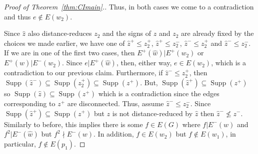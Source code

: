 \documentclass[a4paper, 12pt]{article}
\theoremstyle{plain}
\theoremstyle{definition}
\theoremstyle{remark}
\begin{document}
\begin{proof}[Proof of Theorem~\ref{thm:CImain}.]
Thus, in both cases we come to a contradiction and thus $e \not\in E(w_2)$.
\vspace{2mm}



Since $\hat z$ also distance-reduces $z_2$ and the signs of $\hat z$ and $z_2$ are already fixed by the choices we made earlier, we have one of $\hat z^+ \le z_2^+$, $\hat z^+ \le z_2^-$, $\hat z^- \le z_2^+$ and $\hat z^- \le z_2^-$. If we are in one of the first two cases, then $E^+(\hat w)|E^+(w_2)$ or $E^+(\hat w)|E^-(w_2)$. Since $e|E^+(\hat w)$, then, either way, $e \in E(w_2)$, which is a contradiction to our previous claim. Furthermore, if $\hat z^- \le z_2^+$, then $\operatorname{Supp}(\hat z^-) \subseteq \operatorname{Supp}(z_2^+) \subseteq \operatorname{Supp}(z^+)$. But, $\operatorname{Supp}(\hat z^+) \subseteq \operatorname{Supp}(z^+)$ so $\operatorname{Supp}(\hat z) \subseteq \operatorname{Supp}(z^+)$ which is a contradiction since the edges corresponding to $z^+$ are disconnected. Thus, assume $\hat z^- \le z_2^-$. Since $\operatorname{Supp}(\hat z^+) \subseteq\operatorname{Supp}(z^+)$ but $z$ is not distance-reduced by $\hat z$ then $\hat z^- \not\le z^-$. Similarly to before, this implies there is some $f \in E(G)$ where $f|E^-(w)$ and $f^2|E^-(\hat w)$ but $f^2 \nmid E^-(w)$. In addition, $f \in E(w_2)$ but $f \not\in E(w_1)$, in particular, $f\not\in E(p_1)$.



\end{proof}
\end{document}
